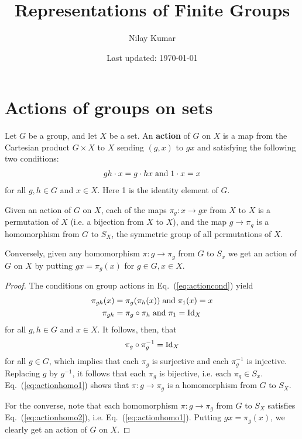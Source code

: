 \documentclass{../mathnotes}
\title{Representations of Finite Groups}
\author{Nilay Kumar}
\date{Last updated: \today}
\begin{document}
\maketitle

\section{Actions of groups on sets}

\begin{defn}
    Let $G$ be a group, and let $X$ be a set. An \textbf{action} of $G$ on $X$ is a map from the Cartesian product $G\times X$ to $X$ sending
    $(g,x)$ to $gx$ and satisfying the following two conditions:
    \begin{align}
        gh\cdot x=g\cdot hx \;\textnormal{and}\; 1\cdot x = x 
        \label{eq:actioncond}
    \end{align}
    for all $g,h\in G$ and $x\in X$. Here 1 is the identity element of $G$.
\end{defn}

\begin{thm}
    Given an action of $G$ on $X$, each of the maps $\pi_g: x\to gx$ from $X$ to $X$ is a permutation of $X$ (i.e. a bijection from $X$ to $X$),
    and the map $g\to\pi_g$ is a homomorphism from $G$ to $S_X$, the symmetric group of all permutations of $X$.

    Conversely, given any homomorphism $\pi:g\to\pi_g$ from $G$ to $S_x$ we get an action of $G$ on $X$ by putting $gx=\pi_g(x)$ for $g\in G,x\in X$.
\end{thm}
\begin{proof}
    The conditions on group actions in Eq.~(\ref{eq:actioncond}) yield
    \begin{align}
        \label{eq:actionhomo1}
        \pi_{gh}(x)&=\pi_g(\pi_h(x)) \;\textnormal{and}\; \pi_1(x)=x\\
        \pi_{gh}&=\pi_g\circ\pi_h \;\textnormal{and}\; \pi_1=\operatorname{Id}_X
        \label{eq:actionhomo2}
    \end{align}
    for all $g,h\in G$ and $x\in X$. It follows, then, that
    \begin{align*}
        \pi_g\circ\pi_g^{-1}=\operatorname{Id}_X
    \end{align*}
    for all $g\in G$, which implies that each $\pi_g$ is surjective and each $\pi_g^{-1}$ is injective. Replacing $g$ by $g^{-1}$, it follows
    that each $\pi_g$ is bijective, i.e. each $\pi_g\in S_x$. Eq.~(\ref{eq:actionhomo1}) shows that $\pi:g\to\pi_g$ is a homomorphism from $G$ to $S_X$.
    
    For the converse, note that each homomorphism $\pi:g\to \pi_g$ from $G$ to $S_X$ satisfies Eq.~(\ref{eq:actionhomo2}), i.e. Eq.~(\ref{eq:actionhomo1}).
    Putting $gx=\pi_g(x)$, we clearly get an action of $G$ on $X$.
\end{proof}
\end{document}
